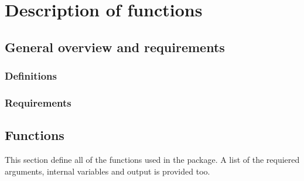 \chapter{Description of functions}\label{Functions}
\section{General overview and requirements}

\subsection{Definitions}
\subsection{Requirements}

\section{Functions}
This section define all of the functions used in the package. A list of the requiered arguments, internal variables and output is provided too. \\






















